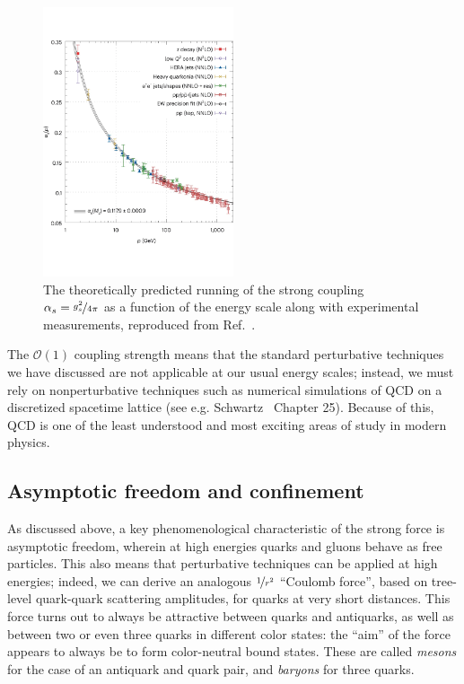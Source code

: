 \begin{figure}[ht]
	\centering
	\includegraphics[width=0.5\textwidth]{figures/01-SM-03-SM/qcd/qcd_running}
	\caption{The theoretically predicted running of the strong coupling $\alpha_s = \cnicefrac{g_s^2}{4\pi}$ as a function of the energy scale along with experimental measurements, reproduced from Ref.~\cite{Boito:2023lzf}.}
	\label{fig:01_sm_qcd_running}
\end{figure}

The $\mathcal O(1)$ coupling strength means that the standard perturbative techniques we have discussed are not applicable at our usual energy scales; instead, we must rely on nonperturbative techniques such as numerical simulations of QCD on a discretized spacetime lattice (see e.g. Schwartz~\cite{Schwartz:2014sze} Chapter 25).
Because of this, QCD is one of the least understood and most exciting areas of study in modern physics.



\subsection{Asymptotic freedom and confinement}
\label{sec:01_sm_qcd_asymptotic}

As discussed above, a key phenomenological characteristic of the strong force is asymptotic freedom, wherein at high energies quarks and gluons behave as free particles.
This also means that perturbative techniques can be applied at high energies; indeed, we can derive an analogous $\cnicefrac{1}{r^2}$ ``Coulomb force'', based on tree-level quark-quark scattering amplitudes, for quarks at very short distances.
This force turns out to always be attractive between quarks and antiquarks, as well as between two or even three quarks in different color states: the ``aim'' of the force appears to always be to form color-neutral bound states.
These are called \textit{mesons} for the case of an antiquark and quark pair, and \textit{baryons} for three quarks.

